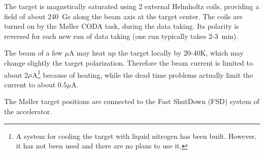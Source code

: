 {The target is magnetically saturated using 2 external
Helmholtz coils, providing a field of about 240~Gs along the beam
axis at the target center. The coils are turned on by the M{\o}ller 
CODA task, during the data taking. Its polarity is reversed for each new
run of data taking (one run typically takes 2-3~min).

\begin{safetyen}{20}{20}
The beam of a few $\mu$A may heat up the target locally by 20-40K,
which may change slightly the target polarization. Therefore
the beam current is limited to about 2$\mu$A\footnote{ 
A system for cooling the target with liquid nitrogen has been built. 
However, it has not been used and there are no plans to use it.}
because of heating, while the dead time problems actually
limit the current to about 0.5$\mu$A.
\end{safetyen}

}

\noindent
    The M{\o}ller target positions are connected to the Fast ShutDown (FSD)
    system of the accelerator.

